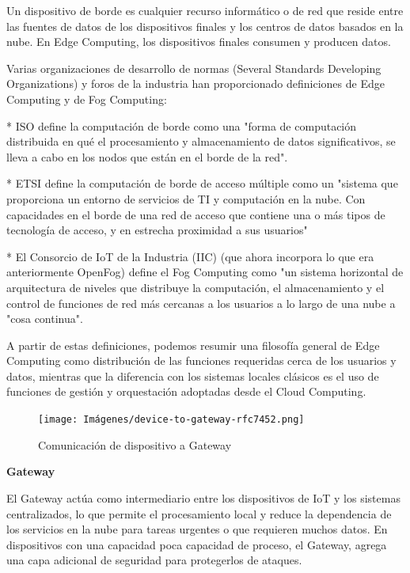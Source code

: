 Un dispositivo de borde es cualquier recurso informático o de red que reside entre las fuentes de datos de los dispositivos finales y los centros de datos basados en la nube.
En Edge Computing, los dispositivos finales consumen y producen datos.

Varias organizaciones de desarrollo de normas (Several Standards Developing Organizations) y foros de la industria han proporcionado definiciones de Edge Computing y de Fog Computing:

   * ISO define la computación de borde como una "forma de computación distribuida en qué el procesamiento y almacenamiento de datos significativos, se lleva a cabo en los nodos que están en el borde de la red".

   * ETSI define la computación de borde de acceso múltiple como un "sistema que proporciona un entorno de servicios de TI y computación en la nube. Con capacidades en el borde de una red de acceso que contiene una o más tipos de tecnología de acceso, y en estrecha proximidad a sus usuarios"

   * El Consorcio de IoT de la Industria (IIC) (que ahora incorpora lo que era anteriormente OpenFog) define el Fog Computing como "un sistema horizontal de arquitectura de niveles que distribuye la computación, el almacenamiento y el control de funciones de red más cercanas a los usuarios a lo largo de una nube a "cosa continua".

   A partir de estas definiciones, podemos resumir una filosofía general de Edge Computing como distribución de las funciones requeridas cerca de los usuarios y datos, mientras que la diferencia con los sistemas locales clásicos es el uso de funciones de gestión y orquestación adoptadas desde el Cloud Computing. \cite{RFC9556}

\begin{figure}[ht] %
    \centering
    \texttt{[image: Imágenes/device-to-gateway-rfc7452.png]}
    \caption{Comunicación de dispositivo a Gateway}
    \label{fig:device-to-gateway-rfc7452}
\end{figure}

\textbf{Gateway}

El Gateway actúa como intermediario entre los dispositivos de IoT y los sistemas centralizados, lo que permite el procesamiento local y reduce la dependencia de los servicios en la nube para tareas urgentes o que requieren muchos datos. En dispositivos con una capacidad poca capacidad de proceso, el Gateway, agrega una capa adicional de seguridad para protegerlos de ataques.\cite{RFC9556}

